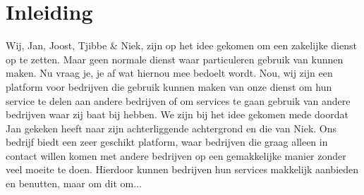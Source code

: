 \chapter{Inleiding}

Wij, Jan, Joost, Tjibbe \& Niek, 
zijn op het idee gekomen om een zakelijke dienst op te zetten. 
Maar geen normale dienst waar particuleren gebruik van kunnen maken.
Nu vraag je, je af wat hiernou mee bedoelt wordt. 
Nou, wij zijn een platform voor bedrijven die gebruik kunnen maken
van onze dienst om hun service te delen aan andere bedrijven of
om services te gaan gebruik van andere bedrijven waar zij baat bij hebben.
We zijn bij het idee gekomen mede doordat Jan gekeken heeft naar zijn achterliggende achtergrond en die van Niek.
Ons bedrijf biedt een zeer geschikt platform,
waar bedrijven die graag alleen in contact willen komen met andere bedrijven op
een gemakkelijke manier zonder veel moeite te doen. 
Hierdoor kunnen bedrijven hun services makkelijk aanbieden en benutten,
maar om dit om...

\iffalse
Met Servicemarkt willen wij een origineel en aansprekend punt worden voor bedrijven
\fi

